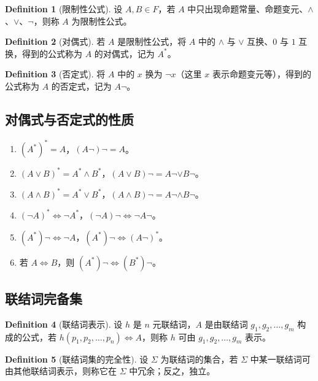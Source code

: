 \documentclass[oneside]{book}
\theoremstyle{definition}
\newtheorem{definition}{Definition}[section]
\begin{document}
\begin{definition}[限制性公式]
	设 \( A, B \in F \)，若 \( A \) 中只出现命题常量、命题变元、\(\land\)、\(\lor\)、\(\neg\)，则称 \( A \) 为限制性公式。
\end{definition}

\begin{definition}[对偶式]
	若 \( A \) 是限制性公式，将 \( A \) 中的 \(\land\) 与 \(\lor\) 互换、\( 0 \) 与 \( 1 \) 互换，得到的公式称为 \( A \) 的对偶式，记为 \( A^* \)。
\end{definition}

\begin{definition}[否定式]
	将 \( A \) 中的 \( x \) 换为 \(\neg x\)（这里 \( x \) 表示命题变元等），得到的公式称为 \( A \) 的否定式，记为 \( A\neg \)。
\end{definition}

\subsection{对偶式与否定式的性质}
\begin{enumerate}
	\item \( (A^*)^* = A \)，\( (A\neg)\neg = A \)。
	\item \( (A \lor B)^* = A^* \land B^* \)，\( (A \lor B)\neg = A\neg \lor B\neg \)。
	\item \( (A \land B)^* = A^* \lor B^* \)，\( (A \land B)\neg = A\neg \land B\neg \)。
	\item \( (\neg A)^* \Leftrightarrow \neg A^* \)，\( (\neg A)\neg \Leftrightarrow \neg A\neg \)。
	\item \( (A^*)\neg \Leftrightarrow \neg A\)，\( (A^*)\neg \Leftrightarrow (A\neg)^* \)。
	\item 若 \( A \Leftrightarrow B \)，则 \( (A^*)\neg \Leftrightarrow (B^*)\neg \)。
\end{enumerate}

\subsection{联结词完备集}
\begin{definition}[联结词表示]
	设 \( h \) 是 \( n \) 元联结词，\( A \) 是由联结词 \( g_1, g_2, \dots, g_m \) 构成的公式，若 \( h(p_1, p_2, \dots, p_n) \Leftrightarrow A \)，则称 \( h \) 可由 \( g_1, g_2, \dots, g_m \) 表示。
\end{definition}

\begin{definition}[联结词集的完全性]
	设 \( \Sigma \) 为联结词的集合，若 \( \Sigma \) 中某一联结词可由其他联结词表示，则称它在 \( \Sigma \) 中冗余；反之，独立。
\end{definition}
\end{document}
